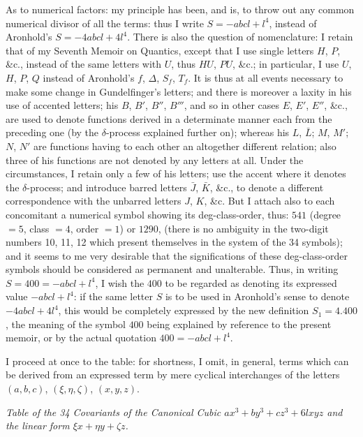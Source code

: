 \documentclass[11pt,a4paper]{article}
\begin{document}
As to numerical factors: my principle has been, and is, to throw out
any common numerical divisor of all the terms: thus I write
$S=-abcl+l^{4}$, instead of Aronhold's $S=-4abcl+4l^{4}$. There is
also the question of nomenclature: I retain that of my Seventh Memoir
on Quantics, except that I use single letters $H$, $P$, \&c., instead
of the same letters with $U$, thus $HU$, $PU$, \&c.; in particular, I
use $U$, $H$, $P$, $Q$ instead of Aronhold's $f$, $\Delta$, $S_{f}$,
$T_{f}$. It is thus at all events necessary to make some change in
Gundelfinger's letters; and there is moreover a laxity in his use of
accented letters; his $B$, $B'$, $B''$, $B'''$, and so in other cases
$E$, $E'$, $E''$, \&c., are used to denote functions derived in a
determinate manner each from the preceding one (by the $\delta$-process
explained further on); whereas his $L$, $\bar L$; $M$, $M'$;
$N$, $N'$ are functions having to each other an altogether different
relation; also three of his functions are not denoted by any letters
at all. Under the circumstances, I retain only a few of his letters;
use the accent where it denotes the $\delta$-process; and introduce
barred letters $\bar J$, $\bar K$, \&c., to denote a different
correspondence with the unbarred letters $J$, $K$, \&c. But I attach
also to each concomitant a numerical symbol showing its
deg-class-order, thus: $541$ (degree $=5$, class $=4$, order $=1$)
or $1290$, (there is no ambiguity in the two-digit numbers 10, 11, 12
which present themselves in the system of the 34 symbols); and it
seems to me very desirable that the significations of these
deg-class-order symbols should be considered as permanent and
unalterable. Thus, in writing $S=400=-abcl+l^{4}$, I wish the $400$
to be regarded as denoting its expressed value $-abcl+l^{4}$: if the
same letter $S$ is to be used in Aronhold's sense to denote
$-4abcl+4l^{4}$, this would be completely expressed by the new
definition $S_{1}=4.400$, the meaning of the symbol $400$ being
explained by reference to the present memoir, or by the actual
quotation $400=-abcl+l^{4}$.

I proceed at once to the table: for shortness, I omit, in general,
terms which can be derived from an expressed term by mere cyclical
interchanges of the letters $(a,b,c)$, $(\xi,\eta,\zeta)$, $(x,y,z)$.

\newpage
\begin{center}
\textit{Table of the 34 Covariants of the Canonical Cubic
$ax^{3}+by^{3}+cz^{3}+6lxyz$ and the linear form $\xi x+\eta y+\zeta z$.}
\end{center}
\end{document}
